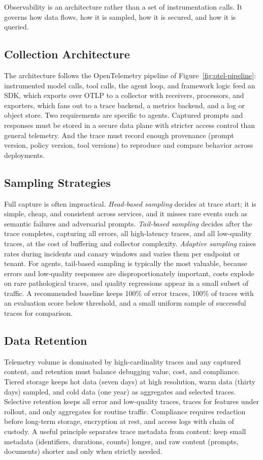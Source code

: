 \documentclass[11pt]{book}
\begin{document}
Observability is an architecture rather than a set of instrumentation calls. It governs how data flows, how it is sampled, how it is secured, and how it is queried.

\subsection{Collection Architecture}

The architecture follows the OpenTelemetry pipeline of Figure~\ref{fig:otel-pipeline}: instrumented model calls, tool calls, the agent loop, and framework logic feed an SDK, which exports over OTLP to a collector with receivers, processors, and exporters, which fans out to a trace backend, a metrics backend, and a log or object store. Two requirements are specific to agents. Captured prompts and responses must be stored in a secure data plane with stricter access control than general telemetry. And the trace must record enough provenance (prompt version, policy version, tool versions) to reproduce and compare behavior across deployments.

\subsection{Sampling Strategies}

Full capture is often impractical. \textit{Head-based sampling} decides at trace start; it is simple, cheap, and consistent across services, and it misses rare events such as semantic failures and adversarial prompts. \textit{Tail-based sampling} decides after the trace completes, capturing all errors, all high-latency traces, and all low-quality traces, at the cost of buffering and collector complexity. \textit{Adaptive sampling} raises rates during incidents and canary windows and varies them per endpoint or tenant. For agents, tail-based sampling is typically the most valuable, because errors and low-quality responses are disproportionately important, costs explode on rare pathological traces, and quality regressions appear in a small subset of traffic. A recommended baseline keeps 100\% of error traces, 100\% of traces with an evaluation score below threshold, and a small uniform sample of successful traces for comparison.

\subsection{Data Retention}

Telemetry volume is dominated by high-cardinality traces and any captured content, and retention must balance debugging value, cost, and compliance. Tiered storage keeps hot data (seven days) at high resolution, warm data (thirty days) sampled, and cold data (one year) as aggregates and selected traces. Selective retention keeps all error and low-quality traces, traces for features under rollout, and only aggregates for routine traffic. Compliance requires redaction before long-term storage, encryption at rest, and access logs with chain of custody. A useful principle separates trace metadata from content: keep small metadata (identifiers, durations, counts) longer, and raw content (prompts, documents) shorter and only when strictly needed.
\end{document}
